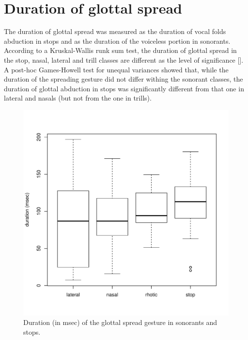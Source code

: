 \documentclass[11pt,a4paper,openany]{memoir}\usepackage[]{graphicx}\usepackage[]{color}
\newenvironment{knitrout}{}{} %
\begin{document}
\section{Duration of glottal spread}
\label{s:gs}
The duration of glottal spread was measured as the duration of vocal folds abduction in stops and as the duration of the voiceless portion in sonorants.
According to a Kruskal-Wallis runk sum test, the duration of glottal spread in the stop, nasal, lateral and trill classes are different as the level of significance [].
A post-hoc Games-Howell test for unequal variances showed that, while the duration of the spreading gesture did not differ withing the sonorant classes, the duration of glottal abduction in stops was significantly different from that one in lateral and nasals (but not from the one in trills).

\begin{figure}
\centering
\begin{knitrout}
\color{fgcolor}
\includegraphics[width=\textwidth]{img/gs-box-1} 

\end{knitrout}
\caption{Duration (in msec) of the glottal spread gesture in sonorants and stops.}
\label{}
\end{figure}
\end{document}
